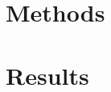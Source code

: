 \ifthesisIsDiss  %
\part{Methods}
\fi


\clearemptydoublepage


\ifthesisIsDiss  %
\part{Results}
\fi


\clearemptydoublepage




\clearemptydoublepage

\clearemptydoublepage

\begin{appendix}

\end{appendix}

\clearemptydoublepage
\backmatter
{}
\iflists
  \listoffigures
  \clearemptydoublepage
  \listoftables
  \clearemptydoublepage
\fi

{
 \ifafive
  \footnotesize
  \setlength{\bibsep}{1pt}
 \else
  \small
  \setlength{\bibsep}{2pt}
 \fi
 \clearemptydoublepage
}

\ifthesisIsDiss
  
  \clearemptydoublepage
\fi



